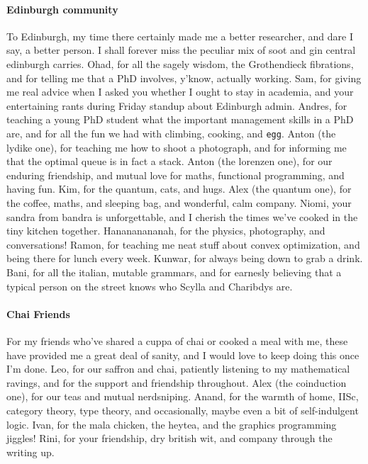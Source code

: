 \paragraph{Edinburgh community}
To Edinburgh, my time there certainly made me a better researcher, and dare I say, a better person.
I shall forever miss the peculiar mix of soot and gin central edinburgh carries.
Ohad, for all the sagely wisdom, the Grothendieck fibrations, and for telling me that a PhD involves, y'know, actually working.
Sam, for giving me real advice when I asked you whether I ought to stay in academia, and your entertaining rants during Friday standup about Edinburgh admin.
Andres, for teaching a young PhD student what the important management skills in a PhD are,
and for all the fun we had with climbing, cooking, and \texttt{egg}.
Anton (the lydike one), for teaching me how to shoot a photograph, and for informing me that the optimal queue is in fact a stack.
Anton (the lorenzen one), for our enduring friendship, and mutual love for maths, functional programming, and having fun.
Kim, for the quantum, cats, and hugs.
Alex (the quantum one), for the coffee, maths, and sleeping bag, and wonderful, calm company.
Niomi, your sandra from bandra is unforgettable, and I cherish the times we've cooked in the tiny kitchen together.
Hanananananah, for the physics, photography, and conversations!
Ramon, for teaching me neat stuff about convex optimization, and being there for lunch every week.
Kunwar, for always being down to grab a drink.
Bani, for all the italian, mutable grammars, and for earnesly believing that a typical person on the street knows who Scylla and Charibdys are.


\paragraph{Chai Friends}
For my friends who've shared a cuppa of chai or cooked a meal with me,
these have provided me a great deal of sanity, and I would love to keep doing this once I'm done.
Leo, for our saffron and chai, patiently listening to my mathematical ravings,
and for the support and friendship throughout.
Alex (the coinduction one), for our teas and mutual nerdsniping.
Anand, for the warmth of home, IISc, category theory, type theory,
and occasionally, maybe even a bit of self-indulgent logic.
Ivan, for the mala chicken, the heytea, and the graphics programming jiggles!
Rini, for your friendship, dry british wit, and company through the writing up.

